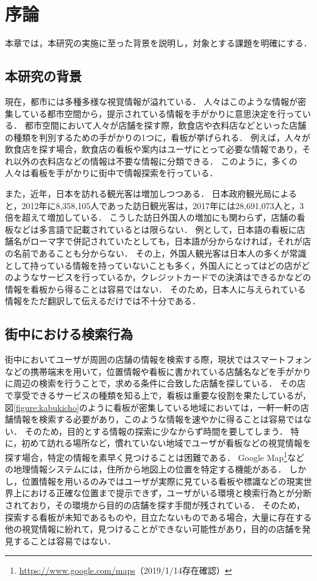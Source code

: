 \chapter{序論}
\label{chapter:introduction}

本章では，本研究の実施に至った背景を説明し，対象とする課題を明確にする．

\section{本研究の背景}
  現在，都市には多種多様な視覚情報が溢れている．
  人々はこのような情報が密集している都市空間から，提示されている情報を手がかりに意思決定を行っている．
  都市空間において人々が店舗を探す際，飲食店や衣料店などといった店舗の種類を判別するための手がかりの1つに，看板が挙げられる．
  例えば，人々が飲食店を探す場合，飲食店の看板や案内はユーザにとって必要な情報であり，それ以外の衣料店などの情報は不要な情報に分類できる．
  このように，多くの人々は看板を手がかりに街中で情報探索を行っている．

  また，近年，日本を訪れる観光客は増加しつつある．
  日本政府観光局によると，2012年に8,358,105人であった訪日観光客は，2017年には28,691,073人と，3倍を超えて増加している\cite{JNTO:2018}．
  こうした訪日外国人の増加にも関わらず，店舗の看板などは多言語で記載されているとは限らない．
  例として，日本語の看板に店舗名がローマ字で併記されていたとしても，日本語が分からなければ，それが店の名前であることも分からない．
  その上，外国人観光客は日本人の多くが常識として持っている情報を持っていないことも多く，外国人にとってはどの店がどのようなサービスを行っているか，クレジットカードでの決済はできるかなどの情報を看板から得ることは容易ではない．
  そのため，日本人に与えられている情報をただ翻訳して伝えるだけでは不十分である\cite{Hayashida:2005}．

\section{街中における検索行為}
\label{section:searching_action}
  街中においてユーザが周囲の店舗の情報を検索する際，現状ではスマートフォンなどの携帯端末を用いて，位置情報や看板に書かれている店舗名などを手がかりに周辺の検索を行うことで，求める条件に合致した店舗を探している．
  その店で享受できるサービスの種類を知る上で，看板は重要な役割を果たしているが，図\ref{figure:kabukicho}のように看板が密集している地域においては，一軒一軒の店舗情報を検索する必要があり，このような情報を速やかに得ることは容易ではない．
  そのため，目的とする情報の探索に少なからず時間を要してしまう．
  特に，初めて訪れる場所など，慣れていない地域でユーザが看板などの視覚情報を探す場合，特定の情報を素早く見つけることは困難である．
  Google Map\footnote{\url{https://www.google.com/maps}（2019/1/14存在確認）}などの地理情報システムには，住所から地図上の位置を特定する機能がある．
  しかし，位置情報を用いるのみではユーザが実際に見ている看板や標識などの現実世界上における正確な位置まで提示できず，ユーザがいる環境と検索行為とが分断されており，その環境から目的の店舗を探す手間が残されている．
  そのため，探索する看板が未知であるものや，目立たないものである場合，大量に存在する他の視覚情報に紛れて，見つけることができない可能性があり，目的の店舗を発見することは容易ではない．

